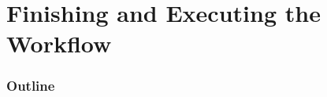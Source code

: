 \section{Finishing and Executing the Workflow}

\begin{frame}
    \frametitle{Outline}
    \begin{columns}[t]
        \begin{column}{.5\textwidth}
            \tableofcontents[sections={1-9},currentsection]
        \end{column}
        \begin{column}{.5\textwidth}
            \tableofcontents[sections={10-18},currentsection]
        \end{column}
    \end{columns}
\end{frame}

